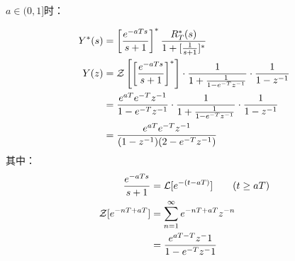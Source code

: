 {{	
	
	$a\in(0,1]$时：
	
	
	\begin{align*}
	Y^*(s) &= \left[\frac{e^{-aTs}}{s+1}\right]^*\frac{R^*_T(s)}{1+[\frac{1}{s+1}]^*} \\
	Y(z)  &={\cal Z}\left[\left[\frac{e^{-aTs}}{s+1}\right]^*\right]\cdot \frac{1}{1+\frac{1}{1-e^{-T}z^{-1}}}\cdot \frac{1}{1-z^{-1}} \\
	&=\frac{e^{aT}e^{-T}z^{-1}}{1-e^{-T}z^{-1}}\cdot \frac{1}{1+\frac{1}{1-e^{-T}z^{-1}}}\cdot \frac{1}{1-z^{-1}} \\
	&=\frac{e^{aT}e^{-T}z^{-1}}{(1-z^{-1})(2-e^{-T}z^{-1})}
	\end{align*}
	其中：
	\begin{align*}
	\frac{e^{-aTs}}{s+1} &= {\cal L}[e^{-(t-aT)}]\qquad (t\geq aT)  \\
	{\cal Z}[e^{-nT+aT} ] &= \sum_{n=1}^{\infty} e^{-nT+aT}z^{-n}\\
	&=\frac{e^{aT-T}z^-1}{1-e^{-T}z^-1}
	\end{align*}
}

}





